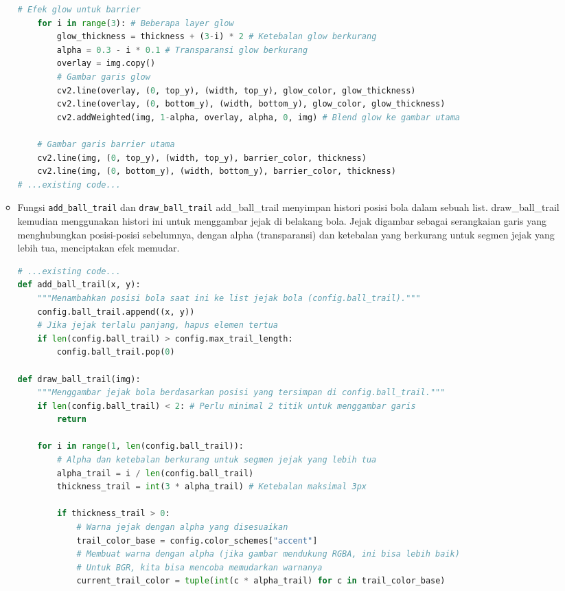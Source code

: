 \documentclass[11pt,a4paper]{article}
\begin{document}
\begin{itemize}
\begin{itemize}
\begin{lstlisting}[language=Python, caption=Fungsi draw\_modern\_barriers]
    # Efek glow untuk barrier
    for i in range(3): # Beberapa layer glow
        glow_thickness = thickness + (3-i) * 2 # Ketebalan glow berkurang
        alpha = 0.3 - i * 0.1 # Transparansi glow berkurang
        overlay = img.copy()
        # Gambar garis glow
        cv2.line(overlay, (0, top_y), (width, top_y), glow_color, glow_thickness)
        cv2.line(overlay, (0, bottom_y), (width, bottom_y), glow_color, glow_thickness)
        cv2.addWeighted(img, 1-alpha, overlay, alpha, 0, img) # Blend glow ke gambar utama
    
    # Gambar garis barrier utama
    cv2.line(img, (0, top_y), (width, top_y), barrier_color, thickness)
    cv2.line(img, (0, bottom_y), (width, bottom_y), barrier_color, thickness)
# ...existing code...
\end{lstlisting}
\item Fungsi \texttt{add\_ball\_trail} dan \texttt{draw\_ball\_trail}
\newline add\_ball\_trail menyimpan histori posisi bola dalam sebuah list. draw\_ball\_trail kemudian menggunakan histori ini untuk menggambar jejak di belakang bola. Jejak digambar sebagai serangkaian garis yang menghubungkan posisi-posisi sebelumnya, dengan alpha (transparansi) dan ketebalan yang berkurang untuk segmen jejak yang lebih tua, menciptakan efek memudar.
\begin{lstlisting}[language=Python, caption=Fungsi add\_ball_\trail dan draw\_ball\_trail]
# ...existing code...
def add_ball_trail(x, y):
    """Menambahkan posisi bola saat ini ke list jejak bola (config.ball_trail)."""
    config.ball_trail.append((x, y))
    # Jika jejak terlalu panjang, hapus elemen tertua
    if len(config.ball_trail) > config.max_trail_length:
        config.ball_trail.pop(0)

def draw_ball_trail(img):
    """Menggambar jejak bola berdasarkan posisi yang tersimpan di config.ball_trail."""
    if len(config.ball_trail) < 2: # Perlu minimal 2 titik untuk menggambar garis
        return
    
    for i in range(1, len(config.ball_trail)):
        # Alpha dan ketebalan berkurang untuk segmen jejak yang lebih tua
        alpha_trail = i / len(config.ball_trail) 
        thickness_trail = int(3 * alpha_trail) # Ketebalan maksimal 3px
        
        if thickness_trail > 0:
            # Warna jejak dengan alpha yang disesuaikan
            trail_color_base = config.color_schemes["accent"]
            # Membuat warna dengan alpha (jika gambar mendukung RGBA, ini bisa lebih baik)
            # Untuk BGR, kita bisa mencoba memudarkan warnanya
            current_trail_color = tuple(int(c * alpha_trail) for c in trail_color_base) 


\end{lstlisting}
\end{itemize}
\end{itemize}
\end{document}
